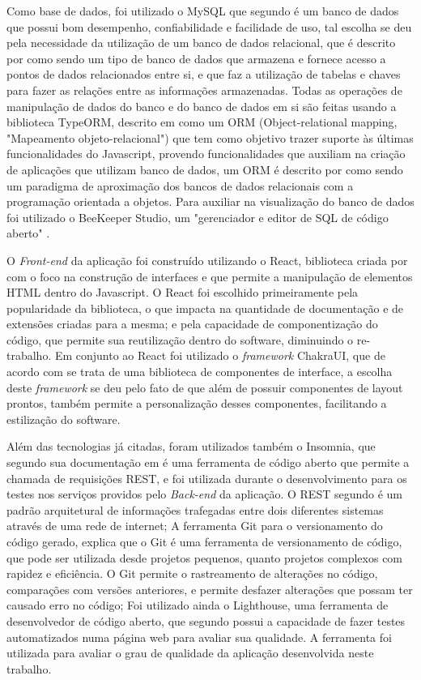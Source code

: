 Como base de dados, foi utilizado o MySQL que segundo \cite{mysql} é um banco de dados que possui bom desempenho, confiabilidade e facilidade de uso, tal escolha se deu pela necessidade da utilização de um banco de dados relacional, que é descrito por \cite{oracle2021bancorelacional} como sendo um tipo de banco de dados que armazena e fornece acesso a pontos de dados relacionados entre si, e que faz a utilização de tabelas e chaves para fazer as relações entre as informações armazenadas. Todas as operações de manipulação de dados do banco e do banco de dados em si são feitas usando a biblioteca TypeORM, descrito em \cite{typeorm} como um ORM (Object-relational mapping, "Mapeamento objeto-relacional") que tem como objetivo trazer suporte às últimas funcionalidades do Javascript, provendo funcionalidades que auxiliam na criação de aplicações que utilizam banco de dados, um ORM é descrito por \cite{fonseca2019orm} como sendo um paradigma de aproximação dos bancos de dados relacionais com a programação orientada a objetos. Para auxiliar na visualização do banco de dados foi utilizado o BeeKeeper Studio, um "gerenciador e editor de SQL de código aberto" \cite{beekeeper}.

O \textit{Front-end} da aplicação foi construído utilizando o React, biblioteca criada por \cite{react} com o foco na construção de interfaces e que permite a manipulação de elementos HTML dentro do Javascript. O React foi escolhido primeiramente pela popularidade da biblioteca, o que impacta na quantidade de documentação e de extensões criadas para a mesma; e pela capacidade de componentização do código, que permite sua reutilização dentro do software, diminuindo o re-trabalho. Em conjunto ao React foi utilizado o \textit{framework} ChakraUI, que de acordo com \cite{chakraui} se trata de uma biblioteca de componentes de interface, a escolha deste \textit{framework} se deu pelo fato de que além de possuir componentes de layout prontos, também permite a personalização desses componentes, facilitando a estilização do software.

Além das tecnologias já citadas, foram utilizados também o Insomnia, que segundo sua documentação em \cite{insomnia} é uma ferramenta de código aberto que permite a chamada de requisições REST, e foi utilizada durante o desenvolvimento para os testes nos serviços providos pelo \textit{Back-end} da aplicação. O REST segundo \cite{costa2020__rest} é um padrão arquitetural de informações trafegadas entre dois diferentes sistemas através de uma rede de internet; A ferramenta Git para o versionamento do código gerado, \cite{git} explica que o Git é uma ferramenta de versionamento de código, que pode ser utilizada desde projetos pequenos, quanto projetos complexos com rapidez e eficiência. O Git permite o rastreamento de alterações no código, comparações com versões anteriores, e permite desfazer alterações que possam ter causado erro no código; Foi utilizado ainda o Lighthouse, uma ferramenta de desenvolvedor de código aberto, que segundo \cite{lighthouse} possui a capacidade de fazer testes automatizados numa página web para avaliar sua qualidade. A ferramenta foi utilizada para avaliar o grau de qualidade da aplicação desenvolvida neste trabalho.

